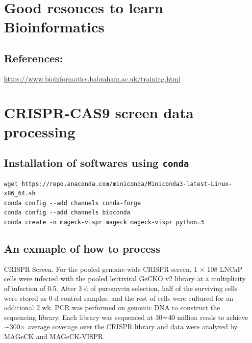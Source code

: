 \documentclass[]{book}
\begin{document}
\hypertarget{good-resouces-to-learn-bioinformatics}{%
\chapter{Good resouces to learn Bioinformatics}\label{good-resouces-to-learn-bioinformatics}}

\hypertarget{references}{%
\section{References:}\label{references}}

\url{https://www.bioinformatics.babraham.ac.uk/training.html}

\hypertarget{crispr-cas9-screen-data-processing}{%
\chapter{CRISPR-CAS9 screen data processing}\label{crispr-cas9-screen-data-processing}}

\hypertarget{installation-of-softwares-using-conda}{%
\section{\texorpdfstring{Installation of softwares using \texttt{conda}}{Installation of softwares using conda}}\label{installation-of-softwares-using-conda}}

\begin{verbatim}
wget https://repo.anaconda.com/miniconda/Miniconda3-latest-Linux-x86_64.sh
conda config --add channels conda-forge
conda config --add channels bioconda
conda create -n mageck-vispr mageck mageck-vispr python=3
\end{verbatim}

\hypertarget{an-exmaple-of-how-to-process}{%
\section{An exmaple of how to process}\label{an-exmaple-of-how-to-process}}

CRISPR Screen.
For the pooled genome-wide CRISPR screen, 1 × 108 LNCaP cells were infected with the pooled lentiviral GeCKO v2 library at a multiplicity of infection of 0.5. After 3 d of puromycin selection, half of the surviving cells were stored as 0-d control samples, and the rest of cells were cultured for an additional 2 wk. PCR was performed on genomic DNA to construct the sequencing library. Each library was sequenced at 30∼40 million reads to achieve ∼300× average coverage over the CRISPR library and data were analyzed by MAGeCK and MAGeCK-VISPR.
\end{document}

